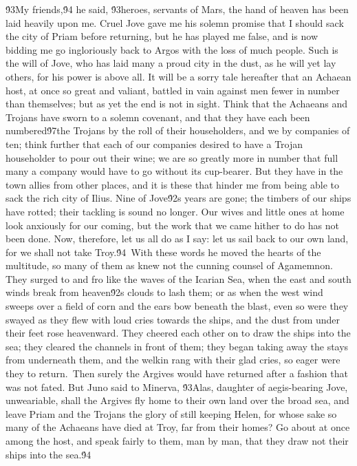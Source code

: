 {\'93My friends,\'94 he said, \'93heroes, servants of Mars, the hand of heaven has been laid heavily upon me. Cruel Jove gave me his solemn promise that I should sack the city of Priam before returning, but he has played me false, and is now bidding me go ingloriously back to Argos with the loss of much people. Such is the will of Jove, who has laid many a proud city in the dust, as he will yet lay others, for his power is above all. It will be a sorry tale hereafter that an Achaean host, at once so great and valiant, battled in vain against men fewer in number than themselves; but as yet the end is not in sight. Think that the Achaeans and Trojans have sworn to a solemn covenant, and that they have each been numbered\'97the Trojans by the roll of their householders, and we by companies of ten; think further that each of our companies desired to have a Trojan householder to pour out their wine; we are so greatly more in number that full many a company would have to go without its cup-bearer. But they have in the town allies from other places, and it is these that hinder me from being able to sack the rich city of Ilius. Nine of Jove\'92s years are gone; the timbers of our ships have rotted; their tackling is sound no longer. Our wives and little ones at home look anxiously for our coming, but the work that we came hither to do has not been done. Now, therefore, let us all do as I say: let us sail back to our own land, for we shall not take Troy.\'94\
With these words he moved the hearts of the multitude, so many of them as knew not the cunning counsel of Agamemnon. They surged to and fro like the waves of the Icarian Sea, when the east and south winds break from heaven\'92s clouds to lash them; or as when the west wind sweeps over a field of corn and the ears bow beneath the blast, even so were they swayed as they flew with loud cries towards the ships, and the dust from under their feet rose heavenward. They cheered each other on to draw the ships into the sea; they cleared the channels in front of them; they began taking away the stays from underneath them, and the welkin rang with their glad cries, so eager were they to return.\
Then surely the Argives would have returned after a fashion that was not fated. But Juno said to Minerva, \'93Alas, daughter of aegis-bearing Jove, unweariable, shall the Argives fly home to their own land over the broad sea, and leave Priam and the Trojans the glory of still keeping Helen, for whose sake so many of the Achaeans have died at Troy, far from their homes? Go about at once among the host, and speak fairly to them, man by man, that they draw not their ships into the sea.\'94\
}

